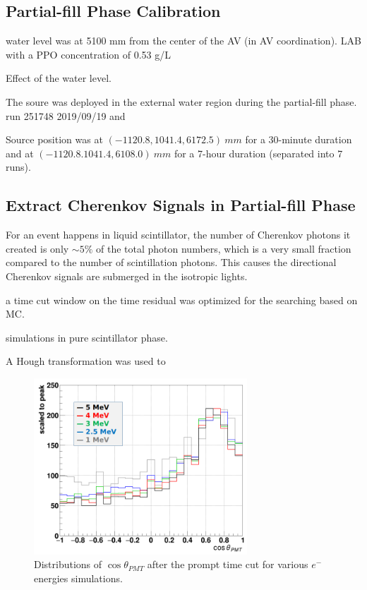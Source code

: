 \subsection{Partial-fill Phase Calibration}

water level was at 5100 mm from the center of the AV (in AV coordination).
LAB with a PPO concentration of 0.53 g/L  

Effect of the water level.



The  soure was deployed in the external water region during the partial-fill phase.
run 251748 2019/09/19 and 


Source position was at $(-1120.8, 1041.4, 6172.5)~ mm$ for a 30-minute duration and at $(-1120.8. 1041.4, 6108.0)~mm$ for a 7-hour duration (separated into 7 runs).

\subsection{Extract Cherenkov Signals in Partial-fill Phase}

For an event happens in liquid scintillator, the number of Cherenkov photons it created is only $\sim 5\%$ 
of the total photon numbers, which is a very small fraction compared to the number of scintillation photons. This causes the directional Cherenkov signals are submerged in the isotropic lights.


a time cut window on the time residual was optimized for the searching based on MC.

simulations in pure scintillator phase.





A Hough transformation was used to 


 





\begin{figure}[!htb]
	\centering
	\includegraphics[width=8cm]{cherenkov_scint_variousE.png}
	\caption{Distributions of $\cos\theta_{PMT}$ after the prompt time cut for various $e^-$ energies simulations.}
	\label{cherenkov_variousE}
\end{figure}







